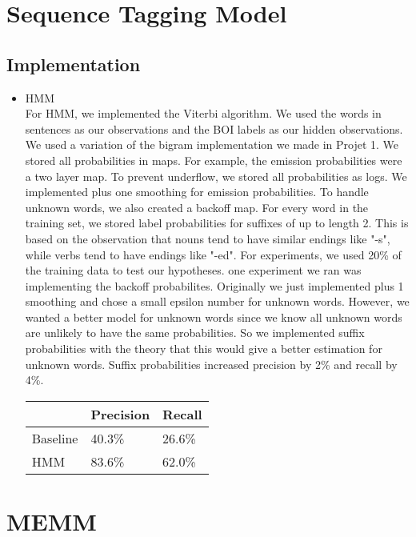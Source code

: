 \documentclass[12pt]{article}
\begin{document}
\maketitle

\section{Sequence Tagging Model}
\subsection{Implementation}
\begin{itemize}
\item HMM\\
For HMM, we implemented the Viterbi algorithm. We used the words in sentences as our observations and the BOI labels as our hidden observations. We used a variation of the bigram implementation we made in Projet 1. We stored all probabilities in maps. For example, the emission probabilities were a two layer map. To prevent underflow, we stored all probabilities as logs. We implemented plus one smoothing for emission probabilities. To handle unknown words, we also created a backoff map. For every word in the training set, we stored label probabilities for suffixes of up to length 2. This is based on the observation that nouns tend to have similar endings like "-s", while verbs tend to have endings like "-ed".
\newline
For experiments, we used 20\% of the training data to test our hypotheses. one experiment we ran was implementing the backoff probabilites. Originally we just implemented plus 1 smoothing and chose a small epsilon number for unknown words. However, we wanted a better model for unknown words since we know all unknown words are unlikely to have the same probabilities. So we implemented suffix probabilities with the theory that this would give a better estimation for unknown words. Suffix probabilities increased precision by 2\% and recall by 4\%.
\newline
\begin{tabular}{|l|l|l|}
\hline
& Precision & Recall \\
\hline
Baseline & 40.3\% & 26.6\%\\
\hline
HMM      & 83.6\% & 62.0\%\\
\hline
\end{tabular}
\end{itemize}
\section{MEMM}
\end{document}

